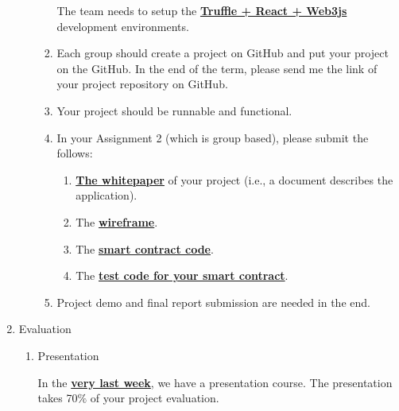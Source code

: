 \documentclass[12pt]{article}
\renewcommand{\_}{\kern-1.5pt\textunderscore\kern-1.5pt}
\begin{document}
\begin{enumerate}
\begin{enumerate}
\begin{enumerate}
The team needs to setup the \textbf{\uline{Truffle + React + Web3js}} development environments. \par

	\item Each group should create a project on GitHub and put your project on the GitHub. In the end of the term, please send me the link of your project repository on GitHub. \par

	\item Your project should be runnable and functional.\par

	\item In your Assignment 2 (which is group based), please submit the follows:\par

\begin{enumerate}
	\item \textbf{\uline{The whitepaper}} of your project (i.e., a document describes the application). \par

	\item The \textbf{\uline{wireframe}}.\par

	\item The \textbf{\uline{smart contract code}}.\par

	\item The \textbf{\uline{test code for your smart contract}}.\par


\end{enumerate}
	\item Project demo and final report submission are needed in the end.\par


\end{enumerate}
\end{enumerate}
	\item Evaluation\par

\begin{enumerate}
	\item Presentation\par

In the \textbf{\uline{very last week}}, we have a presentation course. The presentation takes 70$\%$  of your project evaluation. \par


\end{enumerate}
\end{enumerate}
\end{document}
